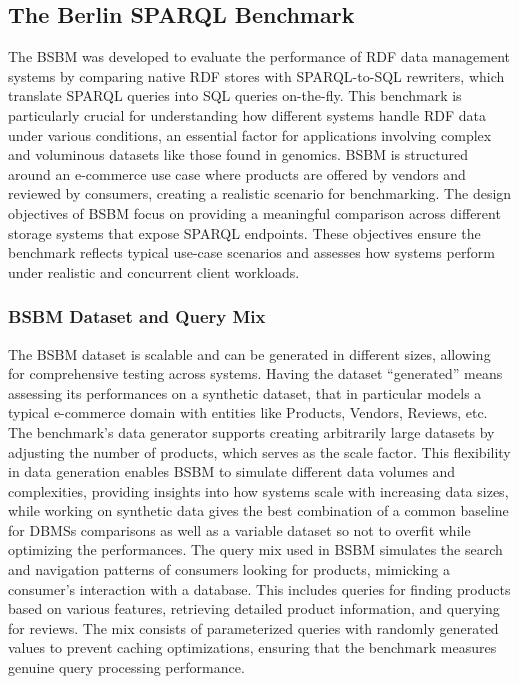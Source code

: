 \subsection{The Berlin SPARQL Benchmark}
The \ac{BSBM} \cite{ DBLP:journals/ijswis/BizerS09} was developed to evaluate the performance of RDF data management systems by comparing native RDF stores with SPARQL-to-SQL rewriters, which translate SPARQL queries into SQL queries on-the-fly. This benchmark is particularly crucial for understanding how different systems handle RDF data under various conditions, an essential factor for applications involving complex and voluminous datasets like those found in genomics.
\ac{BSBM} is structured around an e-commerce use case where products are offered by vendors and reviewed by consumers, creating a realistic scenario for benchmarking. The design objectives of \ac{BSBM} focus on providing a meaningful comparison across different storage systems that expose SPARQL endpoints. These objectives ensure the benchmark reflects typical use-case scenarios and assesses how systems perform under realistic and concurrent client workloads.
\subsubsection{\ac{BSBM} Dataset and Query Mix}
The \ac{BSBM} dataset is scalable and can be generated in different sizes, allowing for comprehensive testing across systems. Having the dataset “generated” means assessing its performances on a synthetic dataset, that in particular models a typical e-commerce domain with entities like Products, Vendors, Reviews, etc. The benchmark's data generator supports creating arbitrarily large datasets by adjusting the number of products, which serves as the scale factor. This flexibility in data generation enables \ac{BSBM} to simulate different data volumes and complexities, providing insights into how systems scale with increasing data sizes, while working on synthetic data gives the best combination of a common baseline for \ac{DBMS}s comparisons as well as a variable dataset so not to overfit while optimizing the performances.
The query mix used in \ac{BSBM} simulates the search and navigation patterns of consumers looking for products, mimicking a consumer's interaction with a database. This includes queries for finding products based on various features, retrieving detailed product information, and querying for reviews. The mix consists of parameterized queries with randomly generated values to prevent caching optimizations, ensuring that the benchmark measures genuine query processing performance.
